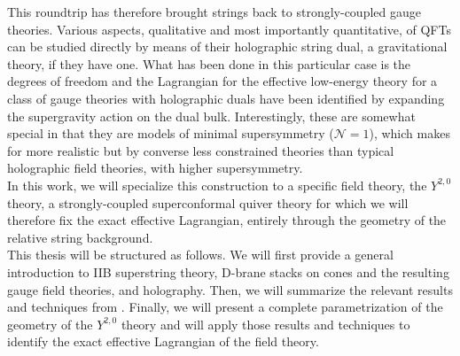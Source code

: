 This roundtrip has therefore brought strings back to strongly-coupled gauge theories. Various aspects, qualitative and most importantly quantitative, of QFTs can be studied directly by means of their holographic string dual, a gravitational theory, if they have one. What has been done in this particular case is the degrees of freedom and the Lagrangian for the effective low-energy theory for a class of gauge theories with holographic duals have been identified by expanding the supergravity action on the dual bulk. Interestingly, these are somewhat special in that they are models of minimal supersymmetry ($\mathcal{N}=1$), which makes for more realistic but by converse less constrained theories than typical holographic field theories, with higher supersymmetry.\\

In this work, we will specialize this construction to a specific field theory, the $Y^{2,0}$ theory, a strongly-coupled superconformal quiver theory for which we will therefore fix the exact effective Lagrangian, entirely through the geometry of the relative string background.\\

This thesis will be structured as follows. We will first provide a general introduction to IIB superstring theory, D-brane stacks on cones and the resulting gauge field theories, and holography. Then, we will summarize the relevant results and techniques from \cite{MZ}. Finally, we will present a complete parametrization of the geometry of the $Y^{2,0}$ theory and will apply those results and techniques to identify the exact effective Lagrangian of the field theory.

~\\
